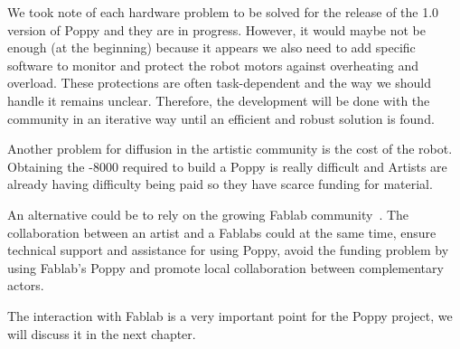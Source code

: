 We took note of each hardware problem to be solved for the release of the 1.0 version of Poppy and they are in progress. However, it would maybe not be enough (at the beginning) because it appears we also need to add specific software to monitor and protect the robot motors against overheating and overload. These protections are often task-dependent and the way we should handle it remains unclear. Therefore, the development will be done with the community in an iterative way until an efficient and robust solution is found.

Another problem for diffusion in the artistic community is the cost of the robot. Obtaining the -8000 required to build a Poppy is really difficult and Artists are already having difficulty being paid so they have scarce funding for material.

An alternative could be to rely on the growing Fablab community~\parencite{anderson2012makers}. The collaboration between an artist and a Fablabs could at the same time, ensure technical support and assistance for using Poppy, avoid the funding problem by using Fablab's Poppy and promote local collaboration between complementary actors.

The interaction with Fablab is a very important point for the Poppy project, we will discuss it in the next chapter.

